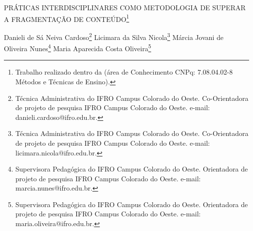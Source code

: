 \documentclass[article,12pt,onesidea,4paper,english,brazil]{abntex2}
\begin{document}
	
	
	\frenchspacing 
	
	\begin{center}
		\LARGE PRÁTICAS INTERDISCIPLINARES COMO METODOLOGIA DE SUPERAR A
		FRAGMENTAÇÃO DE CONTEÚDO\footnote{Trabalho realizado dentro da (área de Conhecimento CNPq: 7.08.04.02-8 Métodos e Técnicas de
			Ensino).}
		
		\normalsize
	Danieli de Sá Neiva Cardoso\footnote{Técnica Administrativa do IFRO Campus Colorado do Oeste. Co-Orientadora de projeto de pesquisa IFRO Campus Colorado do Oeste. e-mail: danieli.cardoso@ifro.edu.br.} 
	Licimara da Silva Nicola\footnote{Técnica Administrativa do IFRO Campus Colorado do Oeste. Co-Orientadora de projeto de pesquisa IFRO Campus Colorado do Oeste. e-mail: licimara.nicola@ifro.edu.br.} 
	Márcia Jovani de Oliveira Nunes\footnote{Supervisora Pedagógica do IFRO Campus Colorado do Oeste. Orientadora de projeto de pesquisa IFRO Campus Colorado do Oeste. e-mail: marcia.nunes@ifro.edu.br.} 
	Maria Aparecida Costa Oliveira\footnote{Supervisora Pedagógica do IFRO Campus Colorado do Oeste. Orientadora de projeto de pesquisa
		IFRO Campus Colorado do Oeste. e-mail: maria.oliveira@ifro.edu.br.} 
	\end{center}
	
\end{document}
